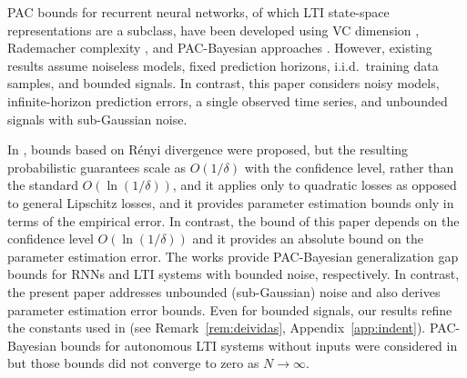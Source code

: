 \documentclass{article}
\begin{document}
\par
PAC bounds for recurrent neural networks, of which LTI state-space representations are a subclass, have been developed using VC dimension \cite{KOIRAN199863,sontag1998learning}, Rademacher complexity \cite{KOIRAN199863,sontag1998learning,pmlr-v108-chen20d}, and PAC-Bayesian approaches \cite{Dziugaite2017}. However, existing results assume noiseless models, fixed prediction horizons, i.i.d.\ training data samples, and bounded signals. In contrast, this paper considers noisy models, infinite-horizon prediction errors, a single observed time series, and unbounded signals with sub-Gaussian noise.
\par
In \cite{eringisRenyi}, bounds based on R\'enyi divergence were proposed, but the resulting probabilistic guarantees scale as $O(1/\delta)$ with the confidence level, rather than the standard $O(\ln(1/\delta))$, and it applies only to quadratic losses as opposed to general Lipschitz losses, and it provides parameter estimation bounds only in terms of the empirical error. 
In contrast, the bound of this paper depends on the confidence level $O(\ln(1/\delta))$ and it provides an absolute bound 
on the parameter estimation error. 
The works \cite{eringis2023pacbayesRNN,eringis2023pacbayesian} provide PAC-Bayesian generalization gap bounds for RNNs and LTI systems with bounded noise, respectively. In contrast, the present paper addresses unbounded (sub-Gaussian) noise and also derives parameter estimation error bounds. Even for bounded signals, our results refine the constants used in \cite{eringis2023pacbayesRNN,eringis2023pacbayesian} (see Remark~\ref{rem:deividas}, Appendix~\ref{app:indent}). 
PAC-Bayesian bounds for autonomous LTI systems without inputs were considered in \cite{CDC21paper} but those bounds did not converge to zero as $N \rightarrow \infty$.
\end{document}

